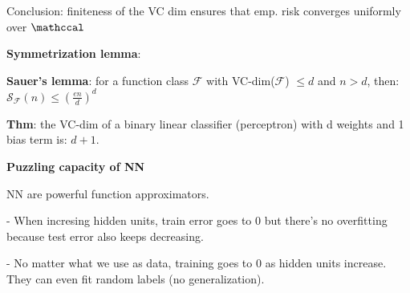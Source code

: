 Conclusion: finiteness of the VC dim ensures that emp. risk converges uniformly over $\mathccal$

\textbf{Symmetrization lemma}:

\textbf{Sauer's lemma}: for a function class $\mathcal F$ with VC-dim($\mathcal F$) $\leq d$ and $n>d$, then: $\mathcal S_{\mathcal F}(n) \leq (\frac{en}{d})^d$

\textbf{Thm}: the VC-dim of a binary linear classifier (perceptron) with d weights and 1 bias term is: $d+1$.

\textbf{Puzzling capacity of NN}

NN are powerful function approximators.

- When incresing hidden units, train error goes to 0 but there's no overfitting because test error also keeps decreasing.

- No matter what we use as data, training goes to 0 as hidden units increase. They can even fit random labels (no generalization).